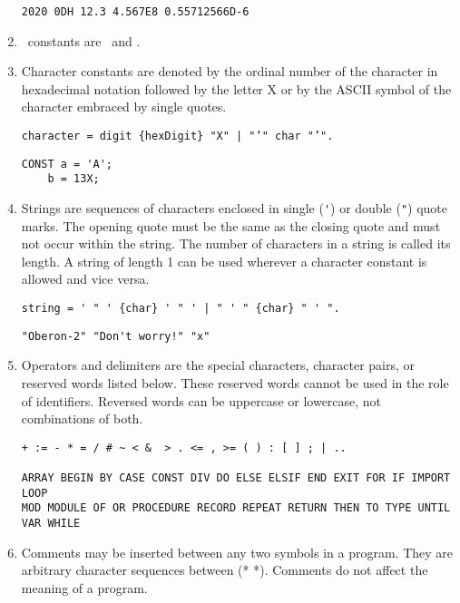 \documentclass[12pt]{article}
\begin{document}
\begin{enumerate}
\begin{lstlisting}[style=example]
    2020 0DH 12.3 4.567E8 0.55712566D-6
\end{lstlisting} 

\item \BOOLEAN\ constants are \TRUE\ and \FALSE. \label{bool-consts}

\item Character constants are denoted by the ordinal number of the character in hexadecimal notation followed by the letter X or by the ASCII symbol of the character embraced by single quotes.

\begin{lstlisting}[style=ebnf]
character = digit {hexDigit} "X" | "’" char "’".
\end{lstlisting}

\begin{lstlisting}[style=example]
CONST a = 'A';
    b = 13X;
\end{lstlisting} 

\item Strings are sequences of characters enclosed in single (\lstinline!'!) or double (\lstinline!"!) quote marks. The opening quote must be the same as the closing quote and must not occur within the string. The number of characters in a string is called its length. A string of length 1 can be used wherever a character constant is allowed and vice versa.

\begin{lstlisting}[style=ebnf]
string = ' " ' {char} ' " ' | " ' " {char} " ' ".
\end{lstlisting}

\begin{lstlisting}[style=example]
"Oberon-2" "Don't worry!" "x"
\end{lstlisting} 

\item Operators and delimiters are the special characters, character pairs, or reserved words listed below. These reserved words  cannot be used in the role of identifiers. Reversed words can be uppercase or lowercase, not combinations of both. 

\begin{lstlisting}[style=example]
+ := - * = / # ~ < &  > . <= , >= ( ) : [ ] ; | ..
    
ARRAY BEGIN BY CASE CONST DIV DO ELSE ELSIF END EXIT FOR IF IMPORT LOOP
MOD MODULE OF OR PROCEDURE RECORD REPEAT RETURN THEN TO TYPE UNTIL
VAR WHILE
\end{lstlisting}

\item Comments may be inserted between any two symbols in a program. They are arbitrary character sequences between (* *). 
Comments do not affect the meaning of a program.

\end{enumerate}
\end{document}
